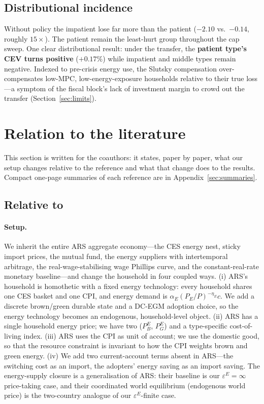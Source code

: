 \documentclass[11pt,a4paper]{article}
\begin{document}
\subsection{Distributional incidence}



Without policy the impatient lose far more than the patient ($-2.10$ vs.\
$-0.14$, roughly $15\times$). The patient remain the least-hurt group
throughout the cap sweep. One clear distributional result: under the
transfer, the \textbf{patient type's CEV turns positive} ($+0.17\%$) while
impatient and middle types remain negative. Indexed to pre-crisis energy use,
the Slutsky compensation over-compensates low-MPC, low-energy-exposure
households relative to their true loss---a symptom of the fiscal block's
lack of investment margin to crowd out the transfer (Section~\ref{sec:limits}).

\section{Relation to the literature}
\label{sec:lit}

This section is written for the coauthors: it states, paper by paper, what our
setup changes relative to the reference and what that change does to the
results. Compact one-page summaries of each reference are in
Appendix~\ref{sec:summaries}.

\subsection{Relative to \citet{ARS2024}}

\paragraph{Setup.} We inherit the entire ARS aggregate economy---the CES
energy nest, sticky import prices, the mutual fund, the energy suppliers with
intertemporal arbitrage, the real-wage-stabilising wage Phillips curve, and the
constant-real-rate monetary baseline---and change the household in four coupled
ways. (i) ARS's household is homothetic with a fixed energy technology: every
household shares one CES basket and one CPI, and energy demand is
$\alpha_E(P_E/P)^{-\eta_E}c$. We add a discrete brown/green durable state and a
DC-EGM adoption choice, so the energy technology becomes an endogenous,
household-level object. (ii) ARS has a single household energy price; we have
two ($P^E_B$, $P^E_G$) and a type-specific cost-of-living index. (iii) ARS uses
the CPI as unit of account; we use the domestic good, so that the resource
constraint is invariant to how the CPI weights brown and green energy. (iv) We
add two current-account terms absent in ARS---the switching cost as an import,
the adopters' energy saving as an import saving. The energy-supply closure is a
generalisation of ARS: their baseline is our $\varepsilon^E=\infty$
price-taking case, and their coordinated world equilibrium (endogenous world
price) is the two-country analogue of our $\varepsilon^E$-finite case.
\end{document}
